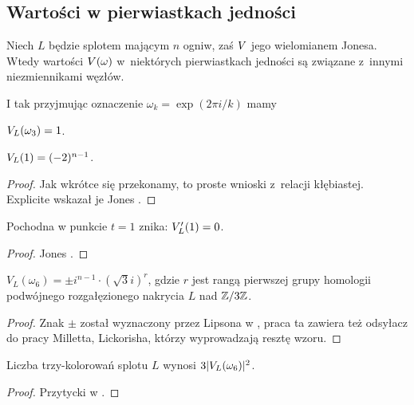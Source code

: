 
\subsection{Wartości w pierwiastkach jedności}
Niech $L$ będzie splotem mającym $n$ ogniw, zaś $V$ jego wielomianem Jonesa.
Wtedy wartości $V(\omega)$ w~niektórych pierwiastkach jedności są związane z~innymi niezmiennikami węzłów.

I tak przyjmując oznaczenie $\omega_k = \exp(2\pi i/k)$ mamy

\begin{proposition}
    \label{prp:jones_at_roots_of_unity}
    $V_L(\omega_3) = 1$.
\end{proposition}

\begin{proposition}
    $V_L(1) = (-2)^{n-1}$.
\end{proposition}

\begin{proof}
%
    Jak wkrótce się przekonamy, to proste wnioski z~relacji kłębiastej.
    Explicite wskazał je Jones \cite[twierdzenie 14, 15]{jones85}.
\end{proof}

\begin{proposition}
    Pochodna w punkcie $t = 1$ znika: $V'_L(1) = 0$.
\end{proposition}

\begin{proof}
    Jones \cite[twierdzenie 16]{jones85}.
\end{proof}

\begin{proposition}
    $V_L(\omega_6) = \pm i^{n-1} \cdot (\sqrt 3i)^r$, gdzie $r$ jest rangą pierwszej grupy homologii podwójnego rozgałęzionego nakrycia $L$ nad $\mathbb Z/3\mathbb Z$.
\end{proposition}

\begin{proof}
%
    Znak $\pm$ został wyznaczony przez Lipsona w \cite{lipson86}, praca ta zawiera też odsyłacz do pracy Milletta, Lickorisha, którzy wyprowadzają resztę wzoru.
\end{proof}

\begin{proposition}
    Liczba trzy-kolorowań splotu $L$ wynosi $3|V_L(\omega_6)|^2$.
\end{proposition}

\begin{proof}
%
    Przytycki w \cite{przytycki98}.
\end{proof}

